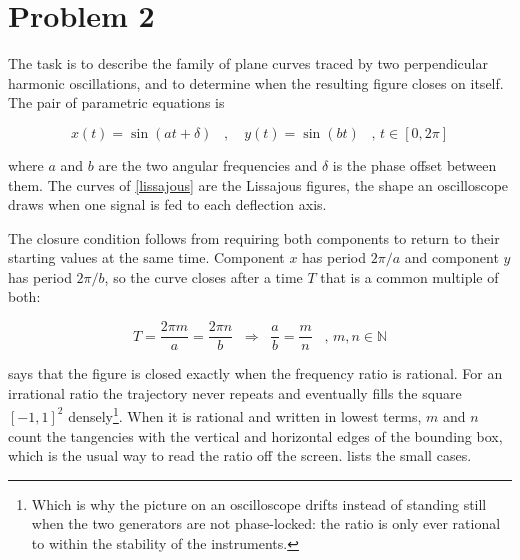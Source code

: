 
\section*{Problem 2}
{}

The task is to describe the family of plane curves traced by two perpendicular
harmonic oscillations, and to determine when the resulting figure closes on
itself. The pair of parametric equations is

\begin{equation} \label{lissajous}
	x(t) = \sin(at + \delta) \; \; \; \text{, } \; \; \; y(t) = \sin(bt)
	\; \; \; \text{, } t \in [0, 2\pi]
\end{equation}

where $a$ and $b$ are the two angular frequencies and $\delta$ is the phase
offset between them. The curves of \cref{lissajous} are the Lissajous figures,
the shape an oscilloscope draws when one signal is fed to each deflection
axis.

The closure condition follows from requiring both components to return to
their starting values at the same time. Component $x$ has period
$2\pi/a$ and component $y$ has period $2\pi/b$, so the curve closes after a
time $T$ that is a common multiple of both:

\begin{equation} \label{closure}
	T = \frac{2\pi m}{a} = \frac{2\pi n}{b}
	\; \; \Rightarrow \; \;
	\frac{a}{b} = \frac{m}{n} \; \; \; \text{, } m, n \in \mathbb{N}
\end{equation}

 says that the figure is closed exactly when the frequency ratio
is rational. For an irrational ratio the trajectory never repeats and
eventually fills the square $[-1,1]^2$ densely\footnote{Which is why the
picture on an oscilloscope drifts instead of standing still when the two
generators are not phase-locked: the ratio is only ever rational to within the
stability of the instruments.}. When it is rational and written in lowest
terms, $m$ and $n$ count the tangencies with the vertical and horizontal edges
of the bounding box, which is the usual way to read the ratio off the screen.
 lists the small cases.

